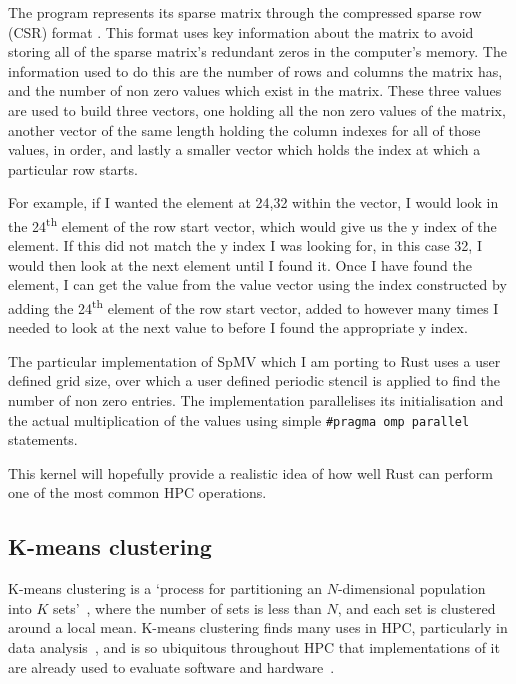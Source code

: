 The program represents its sparse matrix through the compressed sparse row (CSR) format . This format uses key information about the matrix to avoid storing all of the sparse matrix's redundant zeros in the computer's memory. The information used to do this are the number of rows and columns the matrix has, and the number of non zero values which exist in the matrix. These three values are used to build three vectors, one holding all the non zero values of the matrix, another vector of the same length holding the column indexes for all of those values, in order, and lastly a smaller vector which holds the index at which a particular row starts.

For example, if I wanted the element at 24,32 within the vector, I would look in the 24\textsuperscript{th} element of the row start vector, which would give us the y index of the element. If this did not match the y index I was looking for, in this case 32, I would then look at the next element until I found it. Once I have found the element, I can get the value from the value vector using the index constructed by adding the 24\textsuperscript{th} element of the row start vector, added to however many times I needed to look at the next value to before I found the appropriate y index.

The particular implementation of SpMV which I am porting to Rust uses a user defined grid size, over which a user defined periodic stencil is applied to find the number of non zero entries. The implementation parallelises its initialisation and the actual multiplication of the values using simple \texttt{\#pragma omp parallel} statements.

This kernel will hopefully provide a realistic idea of how well Rust can perform one of the most common HPC operations.

\subsection{K-means clustering}

K-means clustering is a `process for partitioning an $N$-dimensional population into $K$ sets'~\cite{macqueen1967}, where the number of sets is less than $N$, and each set is clustered around a local mean. K-means clustering finds many uses in HPC, particularly in data analysis~\cite{DBLP:journals/corr/ChakrabortyND14a, ordovas2014fast}, and is so ubiquitous throughout HPC that implementations of it are already used to evaluate software and hardware~\cite{Yang2014}.

